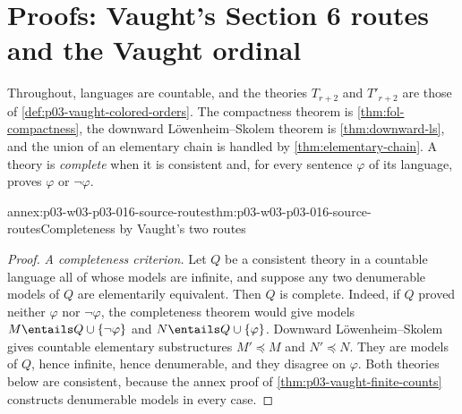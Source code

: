 \section{Proofs: Vaught's Section 6 routes and the Vaught ordinal}
\label{sec:annex-p03-w03-p03-016-vaught}

Throughout, languages are countable, and the theories \(T_{r+2}\) and
\(T'_{r+2}\) are those of \cref{def:p03-vaught-colored-orders}. The
compactness theorem is \cref{thm:fol-compactness}, the downward
L\"owenheim--Skolem theorem is \cref{thm:downward-ls}, and the union of an
elementary chain is handled by \cref{thm:elementary-chain}. A theory is
\emph{complete} when it is consistent and, for every sentence \(\varphi\)
of its language, proves \(\varphi\) or \(\neg\varphi\).

\begin{annexitem}{annex:p03-w03-p03-016-source-routes}{thm:p03-w03-p03-016-source-routes}{Completeness by Vaught's two routes}
\begin{proof}
\emph{A completeness criterion.} Let \(Q\) be a consistent theory in a
countable language all of whose models are infinite, and suppose any two
denumerable models of \(Q\) are elementarily equivalent. Then \(Q\) is
complete. Indeed, if \(Q\) proved neither \(\varphi\) nor \(\neg\varphi\),
the completeness theorem would give models \(M\entails Q\cup\{\neg\varphi\}\)
and \(N\entails Q\cup\{\varphi\}\). Downward L\"owenheim--Skolem gives
countable elementary substructures \(M'\preccurlyeq M\) and
\(N'\preccurlyeq N\). They are models of \(Q\), hence infinite, hence
denumerable, and they disagree on \(\varphi\). Both theories below are
consistent, because the annex proof of
\cref{thm:p03-vaught-finite-counts} constructs denumerable models in every
case.


\end{proof}
\end{annexitem}
